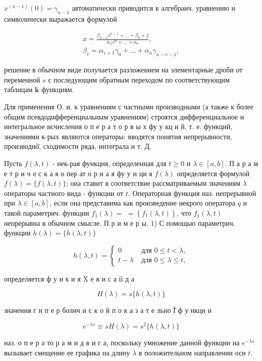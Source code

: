 \documentclass[10pt]{article}
\begin{document}
$x^{(n-1)}(0)=\gamma_{n-1}$ автоматически приводится к алгебраич. уравнению и символически выражается формулой

\[
\begin{gathered}
x=\frac{\beta_{n-1} s^{n-1}+\ldots+\beta_{0}+f}{\alpha_{n} s^{n}+\ldots+\alpha_{0}}, \\
\beta_{v}=\alpha_{v+1} \gamma_{0}+\ldots+\alpha_{n} \gamma_{n-v-1},
\end{gathered}
\]

решение в обычном виде получается разложением на элементарные дроби от переменной $s$ с последующим обратным переходом по соответствующим таблицам $\boldsymbol{k}$ функциям.

Для применения О. и. к уравнениям с частными производными (а также к более общим псевдодифференциальным уравнениям) строятся дифференциальное и интегральное исчисления о п е р а т о р в ы х фу у кц и й, т. е. функций, значениями к-рых являются операторы: вводятся понятия непрерывности, производнӧ̈, сходимости ряда, интеграла и т. Д.

Пусть $f(\lambda, t)$ - нек-рая функция, определенная для $t \geqslant 0$ и $\lambda \in[a, b]$. П а р а м е т р и ч е с к а я о пер ат о р н а я фу у н ци я $f(\lambda)$ определяется формулой $f(\lambda)=\{f(\lambda, t)\}$; она ставит в соответствие рассматриваемым значениям $\lambda$ операторы частного вида - функции от $t$. Операторная функция наз. непрерывной при $\lambda \in[a, b]$, если она представима как произведение некрого оператора $q$ и такой параметрич. функции $f_{1}(\lambda)=$ $=\left\{f_{1}(\lambda, t)\right\}$, что $f_{1}(\lambda, t)$ непрерывна в обычном смысле. П р и м е р ы. 1) С помощью параметрич. функции $h(\lambda)=\{h(\lambda, t)\}$

\[
h(\lambda, t)=\left\{\begin{array}{cl}
0 & \text { для } 0 \leqslant t<\lambda, \\
t-\lambda & \text { для } 0 \leqslant \lambda \leqslant t,
\end{array}\right.
\]

определяется ф у н к и я $\mathrm{X}$ е в и с а їі д а

\[
H(\lambda)=s\{h(\lambda, t)\}
\]

значения г и п е р болич и с к о й п о к а з а т е льно Ї̈ ф у нкци и

\[
e^{-\lambda s} \equiv s H(\lambda)=s^{2}\{h(\lambda, t)\}
\]

наз. о п е р а то р а м и д в и г а, поскольку умножение данной функции на $e^{-\lambda s}$ вызывает смещение ее графика на длину $\lambda$ в положительном направлении оси $t$.
\end{document}
